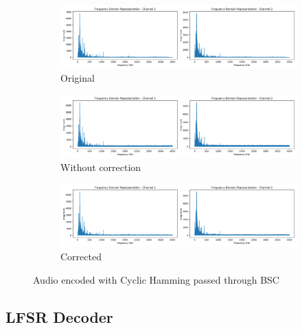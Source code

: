 \documentclass{article}
\begin{document}
\begin{figure}[htb]
    \centering
    \begin{subfigure}[b]{\textwidth}
        \centering
        \includegraphics[width=\textwidth]{../Result/wav-frequency-domain-TX.png}
        \caption{Original}
        \label{fig:f-audio-cyclic-bsc-original}
    \end{subfigure}
    \begin{subfigure}[b]{\textwidth}
        \centering
        \includegraphics[width=\textwidth]{../Result/cyclic-bsc-wav-frequency-domain-RX.png}
        \caption{Without correction}
        \label{fig:f-audio-cyclic-bsc-no-correction}
    \end{subfigure}
    \begin{subfigure}[b]{\textwidth}
        \centering
        \includegraphics[width=\textwidth]{../Result/cyclic-bsc-wav-frequency-domain-RX-syndrome-corrected.png}
        \caption{Corrected}
        \label{fig:f-audio-cyclic-bsc-syndrome-corrected}
    \end{subfigure}
       \caption{Audio encoded with Cyclic Hamming passed through BSC}
       \label{fig:f-audio-cyclic-bsc}
\end{figure}






\subsection{LFSR Decoder}
\end{document}
